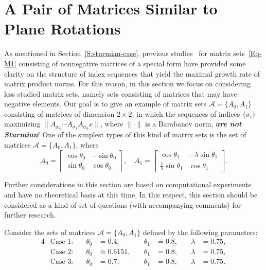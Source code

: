 \documentclass[a4paper,10pt,reqno]{amsart}
\let\cite\citep
\newcommand{\setA}{\mathscr{A}}
\begin{document}
\section{A Pair of Matrices Similar to Plane Rotations}\label{S:rotmaps}
As mentioned in Section~\ref{S:sturmian-case}, previous
studies~\cite{LagWang:LAA95, BM:JAMS02, BTV:SIAMJMA03, Koz:INFOPROC05:e,
Koz:INFOPROC06:e} for matrix sets~\eqref{Eq-M1} consisting of nonnegative
matrices of a special form have provided some clarity on the structure of
index sequences that yield the maximal growth rate of matrix product norms.
For this reason, in this section we focus on considering less studied matrix
sets, namely sets consisting of matrices that may have negative elements. Our
goal is to give an example of matrix sets $\setA=\{A_{0},A_{1}\}$ consisting
of matrices of dimension ${2\times2}$, in which the sequences of indices
$\{\sigma_{i}\}$ maximizing $\|A_{\sigma_{n}}\cdots
A_{\sigma_{1}}A_{\sigma_{0}}x\|$, where $\|\cdot\|$ is a Barabanov norm,
\textbf{\emph{are not Sturmian}}! One of the simplest types of this kind of
matrix sets is the set of matrices $\setA=\{A_{0},A_{1}\}$, where
\begin{equation}\label{Eq-M2}
A_{0}=\left[\begin{array}{cr}
  \cos\theta_{0} & -\sin\theta_{0}\\
  \sin\theta_{0} & \cos\theta_{0}
\end{array}\right],\quad
A_{1}=\left[\begin{array}{rr}
  \cos\theta_{1} & -\lambda\sin\theta_{1}\\
  \frac{1}{\lambda}\sin\theta_{1} & \cos\theta_{1}
\end{array}\right].
\end{equation}

Further considerations in this section are based on computational experiments
and have no theoretical basis at this time. In this respect, this section
should be considered as a kind of set of questions (with accompanying
comments) for further research.

Consider the sets of matrices $\setA=\{A_{0},A_{1}\}$ defined by the following
parameters:
\begin{alignat*}{4}
&\text{Case 1}:\quad&\theta_{0}&=0.4,&\theta_{1}&=0.8,& \lambda&=0.75,\\
&\text{Case 2}:&\theta_{0}&\approx 0.6151,\quad&\theta_{1}&=0.8,\quad
&\lambda&=0.75,\\
&\text{Case 3}:&\theta_{0}&=0.7,&\theta_{1}&=0.8, &\lambda&=0.75.
\end{alignat*}
\end{document}
